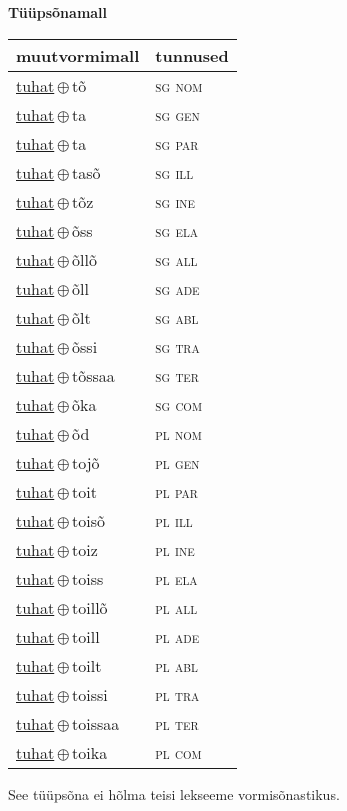 

\vspace{3.5em}
\noindent \begin{minipage}{\textwidth}
\noindent \textbf{Tüüpsõnamall \,}\\

\begin{sideways}
\begin{tabular}{l l}
muutvormimall & tunnused \\
\hline
\underline{tuhat}\,$\oplus$\,tõ & \textsc{ sg nom } \\
\underline{tuhat}\,$\oplus$\,ta & \textsc{ sg gen } \\
\underline{tuhat}\,$\oplus$\,ta & \textsc{ sg par } \\
\underline{tuhat}\,$\oplus$\,tasõ & \textsc{ sg ill } \\
\underline{tuhat}\,$\oplus$\,tõz & \textsc{ sg ine } \\
\underline{tuhat}\,$\oplus$\,õss & \textsc{ sg ela } \\
\underline{tuhat}\,$\oplus$\,õllõ & \textsc{ sg all } \\
\underline{tuhat}\,$\oplus$\,õll & \textsc{ sg ade } \\
\underline{tuhat}\,$\oplus$\,õlt & \textsc{ sg abl } \\
\underline{tuhat}\,$\oplus$\,õssi & \textsc{ sg tra } \\
\underline{tuhat}\,$\oplus$\,tõssaa & \textsc{ sg ter } \\
\underline{tuhat}\,$\oplus$\,õka & \textsc{ sg com } \\
\underline{tuhat}\,$\oplus$\,õd & \textsc{ pl nom } \\
\underline{tuhat}\,$\oplus$\,tojõ & \textsc{ pl gen } \\
\underline{tuhat}\,$\oplus$\,toit & \textsc{ pl par } \\
\underline{tuhat}\,$\oplus$\,toisõ & \textsc{ pl ill } \\
\underline{tuhat}\,$\oplus$\,toiz & \textsc{ pl ine } \\
\underline{tuhat}\,$\oplus$\,toiss & \textsc{ pl ela } \\
\underline{tuhat}\,$\oplus$\,toillõ & \textsc{ pl all } \\
\underline{tuhat}\,$\oplus$\,toill & \textsc{ pl ade } \\
\underline{tuhat}\,$\oplus$\,toilt & \textsc{ pl abl } \\
\underline{tuhat}\,$\oplus$\,toissi & \textsc{ pl tra } \\
\underline{tuhat}\,$\oplus$\,toissaa & \textsc{ pl ter } \\
\underline{tuhat}\,$\oplus$\,toika & \textsc{ pl com } \\
\end{tabular}
\end{sideways}
\label{tab:tüüpsõnamall-tuhattõ}

\end{minipage}

 
\vspace{1em}
\noindent See tüüpsõna ei hõlma teisi lekseeme vormi\-sõnastikus.
